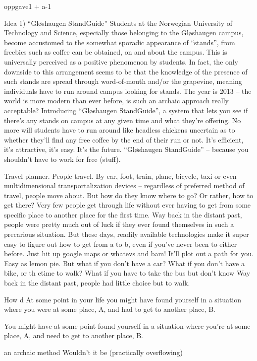 oppgave1 + a-1

Idea 1)
``Gløshaugen StandGuide''
Students at the Norwegian University of Technology and Science, 
especially those belonging to the Gløshaugen campus, 
become accustomed to the somewhat sporadic appearance of ``stands'', 
from freebies such as coffee can be obtained, on and about the campus.
This is universally perceived as a positive phenomenon by students.
In fact, the only downside to this arrangement seems to be that the knowledge of the presence of such stands are spread through word-of-mouth and/or the grapevine,
meaning individuals have to run around campus looking for stands.
The year is 2013 -- the world is more modern than ever before, 
is such an archaic approach really acceptable?
Introducing ``Gløshaugen StandGuide'', a system that lets you see if there's any stands on campus at any given time and what they're offering.
No more will students have to run around like headless chickens uncertain as to whether they'll find any free coffee by the end of their run or not.
It's efficient, it's attractive, it's easy.
It's the future.
``Gløshaugen StandGuide'' -- because you shouldn't have to work for free (stuff).


Travel planner.
People travel. By car, foot, train, plane, bicycle, 
taxi or even multidimensional transportalization devices --
regardless of preferred method of travel, people move about. 
But how do they know where to go? Or rather, how to get there?
Very few people get through life without ever having to get from some specific place to another place for the first time.
Way back in the distant past, people were pretty much out of luck if they ever found themselves in such a precarious situation.
But these days, readily available technologies make it super easy to figure out how to get from a to b, even if you've never been to either before.
Just hit up google maps or whatevs and bam! It'll plot out a path for you.
Easy as lemon pie.
But what if you don't have a car? What if you don't have a bike, or th etime to walk?
What if you have to take the bus but don't know 	
Way back in the distant past, people had little choice but to walk.

How d
At some point in your life you might have found yourself in a situation where you were at some place, 
A, and had to get to another place, B.



You might have at some point found yourself in a situation where you're at some place, A, and need to get to another place, B.



an archaic method 
Wouldn't it be 
(practically overflowing)